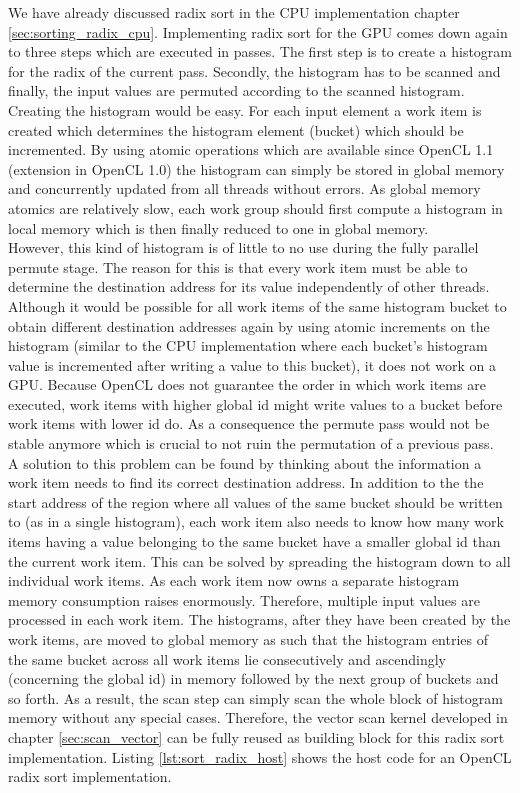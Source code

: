 We have already discussed radix sort in the CPU implementation chapter \ref{sec:sorting_radix_cpu}. Implementing radix sort for the GPU comes down again to three steps which are executed in passes. The first step is to create a histogram for the radix of the current pass. Secondly, the histogram has to be scanned and finally, the input values are permuted according to the scanned histogram.  \\
Creating the histogram would be easy. For each input element a work item is created which determines the histogram element (bucket) which should be incremented. By using atomic operations which are available since OpenCL 1.1 (extension in OpenCL 1.0) the histogram can simply be stored in global memory and concurrently updated from all threads without errors. As global memory atomics are relatively slow, each work group should first compute a histogram in local memory which is then finally reduced to one in global memory. \\
However, this kind of histogram is of little to no use during the fully parallel permute stage. The reason for this is that every work item must be able to determine the destination address for its value independently of other threads. Although it would be possible for all work items of the same histogram bucket to obtain different destination addresses again by using atomic increments on the histogram (similar to the CPU implementation where each bucket's histogram value is incremented after writing a value to this bucket), it does not work on a GPU. Because OpenCL does not guarantee the order in which work items are executed, work items with higher global id might write values to a bucket before work items with lower id do. As a consequence the permute pass would not be stable anymore which is crucial to not ruin the permutation of a previous pass. \\
A solution to this problem can be found by thinking about the information a work item needs to find its correct destination address. In addition to the the start address of the region where all values of the same bucket should be written to (as in a single histogram), each work item also needs to know how many work items having a value belonging to the same bucket have a smaller global id than the current work item. This can be solved by spreading the histogram down to all individual work items. As each work item now owns a separate histogram memory consumption raises enormously. Therefore, multiple input values are processed in each work item. The histograms, after they have been created by the work items, are moved to global memory as such that the histogram entries of the same bucket across all work items lie consecutively and ascendingly (concerning the global id) in memory followed by the next group of buckets and so forth. As a result, the scan step can simply scan the whole block of histogram memory without any special cases. Therefore, the vector scan kernel developed in chapter \ref{sec:scan_vector} can be fully reused as building block for this radix sort implementation. 
Listing \ref{lst:sort_radix_host} shows the host code for an OpenCL radix sort implementation.

